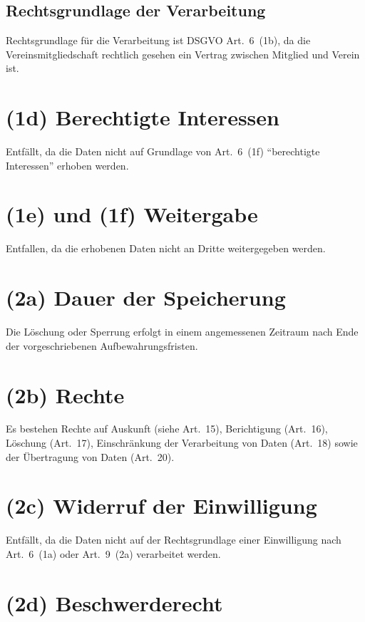 \documentclass{article}
\begin{document}
\subsection*{Rechtsgrundlage der Verarbeitung}

Rechtsgrundlage für die Verarbeitung ist DSGVO Art.~6~(1b), da die
Vereinsmitgliedschaft rechtlich gesehen ein Vertrag zwischen Mitglied
und Verein ist.


\section*{(1d) Berechtigte Interessen}

Entfällt, da die Daten nicht auf Grundlage von Art.~6~(1f)
"`berechtigte Interessen"' erhoben werden.


\section*{(1e) und (1f) Weitergabe}

Entfallen, da die erhobenen Daten nicht an Dritte weitergegeben werden.


\section*{(2a) Dauer der Speicherung}

Die Löschung oder Sperrung erfolgt in einem angemessenen Zeitraum nach
Ende der vorgeschriebenen Aufbewahrungsfristen.


\section*{(2b) Rechte}

Es bestehen Rechte auf Auskunft (siehe Art.~15),
Berichtigung (Art.~16),
Löschung (Art.~17),
Einschränkung der Verarbeitung von Daten (Art.~18)
sowie der Übertragung von Daten (Art.~20).


\section*{(2c) Widerruf der Einwilligung}

Entfällt, da die Daten nicht auf der Rechtsgrundlage einer
Einwilligung nach Art.~6~(1a) oder Art.~9~(2a) verarbeitet werden.


\section*{(2d) Beschwerderecht}
\end{document}
